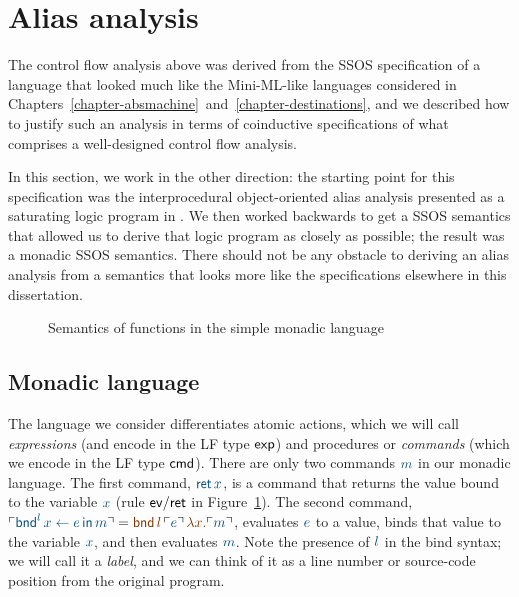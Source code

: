 \section{Alias analysis}
\label{sec:aliasanalysis}

The control flow analysis above was derived from the SSOS
specification of a language that looked much like the Mini-ML-like
languages considered in
Chapters~\ref{chapter-absmachine}~and~\ref{chapter-destinations}, and
we described how to justify such an analysis in terms of coinductive
specifications of what comprises a well-designed control flow
analysis.

In this section, we work in the other direction: the starting point
for this specification was the interprocedural object-oriented alias
analysis presented as a saturating logic program in \cite[Chapter
12.4]{aho07compilers}. We then worked backwards to get a SSOS
semantics that allowed us to derive that logic program as closely as
possible; the result was a monadic SSOS semantics. There should
not be any obstacle to deriving an alias analysis from a
semantics that looks more like the specifications elsewhere in this
dissertation.

\begin{figure}
\caption{Semantics of functions in the simple monadic language}
\label{fig:ssos-monadic}
\end{figure}

\subsection{Monadic language}

The language we consider differentiates atomic actions, which we will
call {\it expressions} (and encode in the LF type ${\sf exp}$) and
procedures or {\it commands} (which we encode in the LF type ${\sf
  cmd}$). There are only two commands $\obj{m}$ in our monadic language. The
first command, $\obj{{\sf ret}\,x}$, is a command that returns the value
bound to the variable $\obj{x}$ (rule ${\sf ev/ret}$ in
Figure~\ref{fig:ssos-monadic}). The second command, $\interp{{\sf
    bnd}^l\, x \leftarrow e \,{\sf in}\,m} = \lf{{\sf
  bnd}\,l\,\interp{e}\,\lambda x.\interp{m}}$, evaluates $\obj{e}$ to a
value, binds that value to the variable $\obj{x}$, and then evaluates
$\obj{m}$. Note the presence of $\obj{l}$ 
in the bind syntax; we will call it a
{\it label}, and we can think of it as a line number or source-code
position from the original program.

